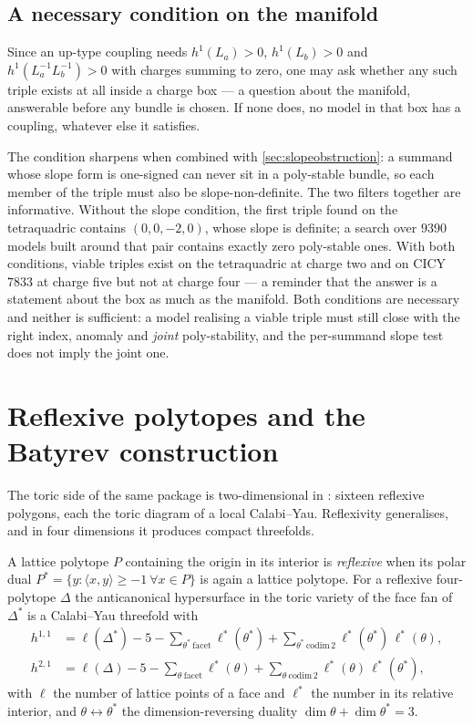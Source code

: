 \documentclass[11pt,a4paper]{article}
\theoremstyle{definition}
\begin{document}
\subsection{A necessary condition on the manifold}

Since an up-type coupling needs $h^1(L_a) > 0$, $h^1(L_b) > 0$ and
$h^1(L_a^{-1} L_b^{-1}) > 0$ with charges summing to zero, one may ask whether
any such triple exists at all inside a charge box --- a question about the
manifold, answerable before any bundle is chosen. If none does, no model in
that box has a coupling, whatever else it satisfies.

The condition sharpens when combined with \cref{sec:slopeobstruction}: a
summand whose slope form is one-signed can never sit in a poly-stable bundle,
so each member of the triple must also be slope-non-definite. The two filters
together are informative. Without the slope condition, the first triple found
on the tetraquadric contains $(0,0,-2,0)$, whose slope is definite; a search
over $9390$ models built around that pair contains exactly zero poly-stable
ones. With both conditions, viable triples exist on the tetraquadric at charge
two and on CICY~$7833$ at charge five but not at charge four --- a reminder
that the answer is a statement about the box as much as the manifold. Both
conditions are necessary and neither is sufficient: a model realising a viable
triple must still close with the right index, anomaly and \emph{joint}
poly-stability, and the per-summand slope test does not imply the joint one.

\section{Reflexive polytopes and the Batyrev construction}
\label{sec:polytopes}

The toric side of the same package is two-dimensional in
\cite{SuppFigures}: sixteen reflexive polygons, each the toric diagram of a
local Calabi--Yau. Reflexivity generalises, and in four dimensions it produces
compact threefolds.

A lattice polytope $P$ containing the origin in its interior is
\emph{reflexive} when its polar dual
$P^* = \{y : \langle x,y\rangle \ge -1 \ \forall x \in P\}$ is again a lattice
polytope. For a reflexive four-polytope $\Delta$ the anticanonical
hypersurface in the toric variety of the face fan of $\Delta^*$ is a
Calabi--Yau threefold with
%
\begin{align}
h^{1,1} &= \ell(\Delta^*) - 5
- \sum_{\theta^* \ \mathrm{facet}} \ell^*(\theta^*)
+ \sum_{\theta^* \ \mathrm{codim}\,2} \ell^*(\theta^*)\, \ell^*(\theta) ,
\label{eq:batyrev11}\\
h^{2,1} &= \ell(\Delta) - 5
- \sum_{\theta \ \mathrm{facet}} \ell^*(\theta)
+ \sum_{\theta \ \mathrm{codim}\,2} \ell^*(\theta)\, \ell^*(\theta^*) ,
\label{eq:batyrev21}
\end{align}
%
with $\ell$ the number of lattice points of a face and $\ell^*$ the number in
its relative interior, and $\theta \leftrightarrow \theta^*$ the
dimension-reversing duality $\dim\theta + \dim\theta^* = 3$.
\end{document}
